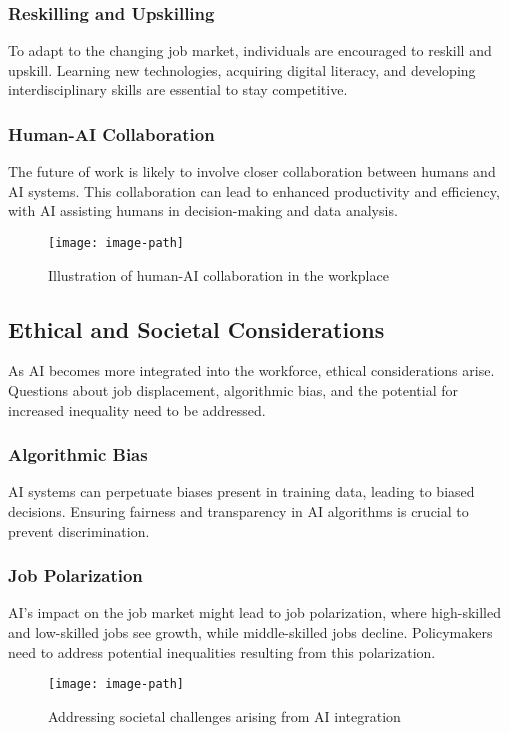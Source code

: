 \subsubsection{Reskilling and Upskilling}
To adapt to the changing job market, individuals are encouraged to reskill and upskill. Learning new technologies, acquiring digital literacy, and developing interdisciplinary skills are essential to stay competitive.

\subsubsection{Human-AI Collaboration}
The future of work is likely to involve closer collaboration between humans and AI systems. This collaboration can lead to enhanced productivity and efficiency, with AI assisting humans in decision-making and data analysis.

\begin{figure}[hbt!]
 \centering
 \texttt{[image: image-path]}
 \caption{Illustration of human-AI collaboration in the workplace}
 \label{fig:human-ai-collab}
\end{figure}
\FloatBarrier

\subsection{Ethical and Societal Considerations}
As AI becomes more integrated into the workforce, ethical considerations arise. Questions about job displacement, algorithmic bias, and the potential for increased inequality need to be addressed.

\subsubsection{Algorithmic Bias}
AI systems can perpetuate biases present in training data, leading to biased decisions. Ensuring fairness and transparency in AI algorithms is crucial to prevent discrimination.

\subsubsection{Job Polarization}
AI's impact on the job market might lead to job polarization, where high-skilled and low-skilled jobs see growth, while middle-skilled jobs decline. Policymakers need to address potential inequalities resulting from this polarization.

\begin{figure}[hbt!]
 \centering
 \texttt{[image: image-path]}
 \caption{Addressing societal challenges arising from AI integration}
 \label{fig:ai-society}
\end{figure}
\FloatBarrier

